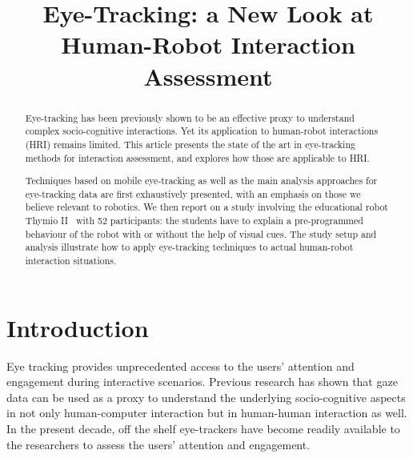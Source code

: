 \documentclass{sig-alternate}
\title{\LARGE \bf
    Eye-Tracking: a New Look at Human-Robot Interaction Assessment
}
\begin{document}
\maketitle
\begin{abstract}


Eye-tracking has been previously shown to be an effective proxy to understand
complex socio-cognitive interactions. Yet its application to human-robot
interactions (HRI) remains limited. This article presents the state of the
art in eye-tracking methods for interaction assessment, and explores how those
are applicable to HRI.

Techniques based on mobile eye-tracking as well as the main analysis approaches
for eye-tracking data are first exhaustively presented, with an emphasis on
those we believe relevant to robotics. We then report on a study involving the
educational robot Thymio II~\cite{riedo2012two} with 52 participants: the
students have to explain a pre-programmed behaviour of the robot with or without
the help of visual cues. The study setup and analysis illustrate how to apply
eye-tracking techniques to actual human-robot interaction situations.

\end{abstract}
\section{Introduction}

Eye tracking provides unprecedented access to the users' attention and
engagement during interactive scenarios. Previous research \cite{hasse2012measure,tien2010measuring,jermann2010using,sharma2012gaze} has shown
that gaze data can be used as a proxy to understand the underlying
socio-cognitive aspects in not only human-computer interaction but in
human-human interaction as well. In the present decade, off the shelf
eye-trackers have become readily available to the researchers to assess
the users' attention and engagement.

%
\end{document}
